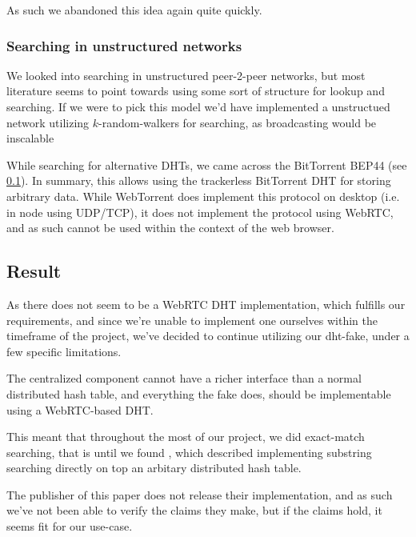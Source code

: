 As such we abandoned this idea again quite quickly.

\subsubsection{Searching in unstructured networks}

We looked into searching in unstructured peer-2-peer networks, but most
literature seems to point towards using some sort of structure for lookup and 
searching. If we were to pick this model we'd have implemented a unstructued 
network utilizing $k$-random-walkers for searching, as broadcasting would be 
inscalable \citep{}

While searching for alternative DHTs, we came across the BitTorrent BEP44 (see
\ref{}). In summary, this allows using the trackerless BitTorrent DHT for 
storing arbitrary data. While WebTorrent does implement this protocol on 
desktop (i.e. in node using UDP/TCP), it does not implement the protocol using
WebRTC, and as such cannot be used within the context of the web browser.

\subsection{Result}
As there does not seem to be a WebRTC DHT implementation, which fulfills our 
requirements, and since we're unable to implement one ourselves within the 
timeframe of the project, we've decided to continue utilizing our dht-fake,
under a few specific limitations.

The centralized component cannot have a richer interface than a normal
distributed hash table, and everything the fake does, should be implementable
using a WebRTC-based DHT.

This meant that throughout the most of our project, we did exact-match
searching, that is until we found \citep{}, which described implementing
substring searching directly on top an arbitary distributed hash table.

The publisher of this paper does not release their implementation, and as such
we've not been able to verify the claims they make, but if the claims hold, it
seems fit for our use-case.

